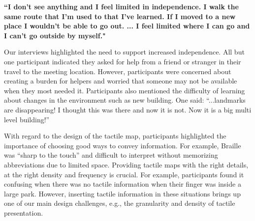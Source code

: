 \textbf{“I don’t see anything and I feel limited in independence. I walk the same route that I’m used to that I’ve learned. If I moved to a new place I wouldn’t be able to go out. ... I feel limited where I can go and I can’t go outside by myself."}

Our interviews highlighted the need to support increased independence. All but one participant indicated they asked for help from a friend or stranger in their travel to the meeting location. %
However, participants were concerned about creating a burden for helpers and worried that someone may not be available when they most needed it. 
Participants also mentioned the difficulty of learning about changes in the environment such as new building. One said: %
``...landmarks are disappearing! I thought this was there and now it is not. Now it is a big multi level building!''

With regard to the design of the tactile map, participants highlighted the importance of choosing good ways to convey information. For example, Braille was ``sharp to the touch'' and difficult to interpret without memorizing abbreviations due to limited space. Providing tactile maps with the right details, at the right density and frequency is crucial. For example, participants found it confusing when there was no tactile information when their finger was inside a large park. However, inserting tactile information in these situations brings up one of our main design challenges, e.g., the granularity and density of tactile presentation.




